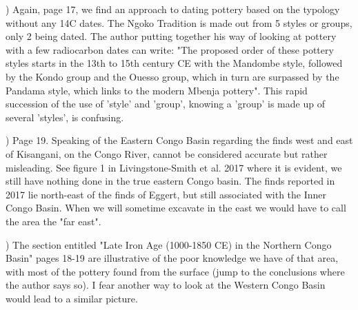 \begin{reviewer}
) Again, page 17, we find an approach to dating pottery based on the typology without any 14C dates. The Ngoko Tradition is made out from 5 styles or groups, only 2 being dated. The author putting together his way of looking at pottery with a few radiocarbon dates can write: "The proposed order of these pottery styles starts in the 13th to 15th century CE with the Mandombe style, followed by the Kondo group and the Ouesso group, which in turn are surpassed by the Pandama style, which links to the modern Mbenja pottery". This rapid succession of the use of 'style' and 'group', knowing a 'group' is made up of several 'styles', is confusing.


) Page 19. Speaking of the Eastern Congo Basin regarding the finds west and east of Kisangani, on the Congo River, cannot be considered accurate but rather misleading. See figure 1 in Livingstone-Smith et al. 2017 where it is evident, we still have nothing done in the true eastern Congo basin. The finds reported in 2017 lie north-east of the finds of Eggert, but still associated with the Inner Congo Basin. When we will sometime excavate in the east we would have to call the area the "far east".


) The section entitled "Late Iron Age (1000-1850 CE) in the Northern Congo Basin" pages 18-19 are illustrative of the poor knowledge we have of that area, with most of the pottery found from the surface (jump to the conclusions where the author says so). I fear another way to look at the Western Congo Basin would lead to a similar picture.


\end{reviewer}
